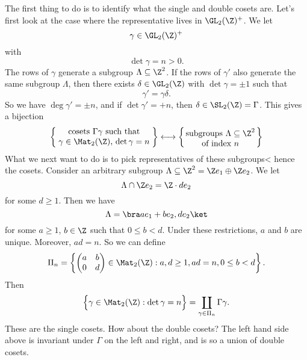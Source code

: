 \documentclass[a4paper]{article}
\begin{document}
The first thing to do is to identify what the single and double cosets are. Let's first look at the case where the representative lives in $\GL_2(\Z)^+$. We let
\[
  \gamma \in \GL_2(\Z)^+
\]
with
\[
  \det \gamma = n > 0.
\]
The rows of $\gamma$ generate a subgroup $\Lambda \subseteq \Z^2$. If the rows of $\gamma'$ also generate the same subgroup $\Lambda$, then there exists $\delta \in \GL_2(\Z)$ with $\det \gamma = \pm 1$ such that
\[
  \gamma' = \gamma \delta.
\]
So we have $\deg \gamma' = \pm n$, and if $\det \gamma' = +n$, then $\delta \in \SL_2(\Z) = \Gamma$. This gives a bijection
\[
  \left\{\parbox{4cm}{\centering cosets $\Gamma \gamma$ such that\\$\gamma \in \Mat_2(\Z)$, $\det \gamma = n$}\right\} \longleftrightarrow \left\{\parbox{3cm}{\centering subgroups $\Lambda \subseteq \Z^2$ of index $n$} \right\}
\]
What we next want to do is to pick representatives of these subgroups< hence the cosets. Consider an arbitrary subgroup $\Lambda \subseteq \Z^2 = \Z e_1 \oplus \Z e_2$. We let
\[
  \Lambda \cap \Z e_2 = \Z \cdot d e_2
\]
for some $d \geq 1$. Then we have
\[
  \Lambda = \bra ae_1 + be_2, d e_2 \ket
\]
for some $a \geq 1$, $b \in \Z$ such that $0 \leq b < d$. Under these restrictions, $a$ and $b$ are unique. Moreover, $ad = n$. So we can define
\[
  \Pi_n = \left\{
    \begin{pmatrix}
      a & b\\
      0 & d
    \end{pmatrix} \in \Mat_2(\Z): a, d \geq 1, ad = n, 0 \leq b < d
  \right\}.
\]
Then
\[
  \Big\{\gamma \in \Mat_2(\Z): \det \gamma = n\Big\} = \coprod_{\gamma \in \Pi_n}\Gamma \gamma.
\]
These are the single cosets. How about the double cosets? The left hand side above is invariant under $\Gamma$ on the left and right, and is so a union of double cosets.
\end{document}
